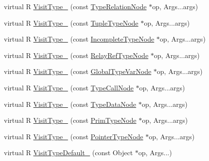\begin{DoxyCompactItemize}
\item 
virtual R \hyperlink{classtvm_1_1TypeFunctor_3_01R_07const_01Type_01_6n_00_01Args_8_8_8_08_4_a59f150c83a601663d0f56ca14afba603}{Visit\+Type\+\_\+} (const \hyperlink{classtvm_1_1TypeRelationNode}{Type\+Relation\+Node} $\ast$op, Args...\+args)
\item 
virtual R \hyperlink{classtvm_1_1TypeFunctor_3_01R_07const_01Type_01_6n_00_01Args_8_8_8_08_4_ad1b38cf92f6a8400d0e0c9d7480ccbf7}{Visit\+Type\+\_\+} (const \hyperlink{classtvm_1_1TupleTypeNode}{Tuple\+Type\+Node} $\ast$op, Args...\+args)
\item 
virtual R \hyperlink{classtvm_1_1TypeFunctor_3_01R_07const_01Type_01_6n_00_01Args_8_8_8_08_4_aa74b61efd6210a7d95e07086827297e0}{Visit\+Type\+\_\+} (const \hyperlink{classtvm_1_1IncompleteTypeNode}{Incomplete\+Type\+Node} $\ast$op, Args...\+args)
\item 
virtual R \hyperlink{classtvm_1_1TypeFunctor_3_01R_07const_01Type_01_6n_00_01Args_8_8_8_08_4_a4ed63aa95ed7c6a03f12bb0fd13ba868}{Visit\+Type\+\_\+} (const \hyperlink{classtvm_1_1RelayRefTypeNode}{Relay\+Ref\+Type\+Node} $\ast$op, Args...\+args)
\item 
virtual R \hyperlink{classtvm_1_1TypeFunctor_3_01R_07const_01Type_01_6n_00_01Args_8_8_8_08_4_ac080f078b2964af61b7bd4fb6f1c3339}{Visit\+Type\+\_\+} (const \hyperlink{classtvm_1_1GlobalTypeVarNode}{Global\+Type\+Var\+Node} $\ast$op, Args...\+args)
\item 
virtual R \hyperlink{classtvm_1_1TypeFunctor_3_01R_07const_01Type_01_6n_00_01Args_8_8_8_08_4_a8964508f42a85ccc9e2c9dcd23e1e58d}{Visit\+Type\+\_\+} (const \hyperlink{classtvm_1_1TypeCallNode}{Type\+Call\+Node} $\ast$op, Args...\+args)
\item 
virtual R \hyperlink{classtvm_1_1TypeFunctor_3_01R_07const_01Type_01_6n_00_01Args_8_8_8_08_4_a91bc40008f698329ac0a908b2c9f02c1}{Visit\+Type\+\_\+} (const \hyperlink{classtvm_1_1TypeDataNode}{Type\+Data\+Node} $\ast$op, Args...\+args)
\item 
virtual R \hyperlink{classtvm_1_1TypeFunctor_3_01R_07const_01Type_01_6n_00_01Args_8_8_8_08_4_ad542e58430966e853bdef0ec2e01f379}{Visit\+Type\+\_\+} (const \hyperlink{classtvm_1_1PrimTypeNode}{Prim\+Type\+Node} $\ast$op, Args...\+args)
\item 
virtual R \hyperlink{classtvm_1_1TypeFunctor_3_01R_07const_01Type_01_6n_00_01Args_8_8_8_08_4_aff7dbebbf8fd2fdd5ce9dd23a85fa36f}{Visit\+Type\+\_\+} (const \hyperlink{classtvm_1_1PointerTypeNode}{Pointer\+Type\+Node} $\ast$op, Args...\+args)
\item 
virtual R \hyperlink{classtvm_1_1TypeFunctor_3_01R_07const_01Type_01_6n_00_01Args_8_8_8_08_4_a91553f9e04c39b3821a70ae4f7b0c597}{Visit\+Type\+Default\+\_\+} (const Object $\ast$op, Args...)
\end{DoxyCompactItemize}


